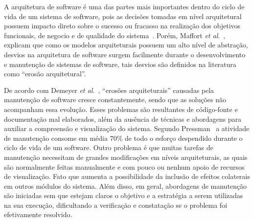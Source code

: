 \documentclass[12pt]{article}
\begin{document}
A arquitetura de software é uma das partes mais importantes dentro do ciclo de vida de um sistema de software, pois as decisões tomadas em nível arquitetural possuem impacto direto sobre o sucesso ou fracasso na realização dos objetivos funcionais, de negocio e de qualidade do sistema~\cite{Garcia2009}. Porém, Maffort \textit{et al}.~\cite{Maffort_2013}, explicam que como os modelos arquiteturais possuem um alto nível de abstração, desvios na arquitetura de software surgem facilmente durante o desenvolvimento e manutenção de sistemas de software, tais desvios são definidos na literatura como ``erosão arquitetural''. 

De acordo com Demeyer \textit{et al.}~\cite{Demeyer1}, ``erosões arquiteturais'' causadas pela manutenção de software cresce constantemente, sendo que as soluções não acompanham essa evolução. Esses problemas são resultantes de código-fonte e documentação mal elaborados, além da ausência de técnicas e abordagens para auxiliar a compreensão e visualização do sistema. Segundo Pressman~\cite{Pressman} a atividade de manutenção consome em média 70\% de todo o esforço despendido durante o ciclo de vida de um software. Outro problema é que muitas tarefas de manutenção necessitam de grandes modificações em níveis arquiteturais, as quais são normalmente feitas manualmente e com pouco ou nenhum apoio de recursos de visualização. Fato que aumenta a possibilidade da inclusão de efeitos colaterais em outros módulos do sistema. Além disso, em geral, abordagens de manutenção são iniciadas sem que estejam claros o objetivo e a estratégia a serem utilizadas na sua execução, dificultando a verificação e constatação se o problema foi efetivamente resolvido.
\end{document}
